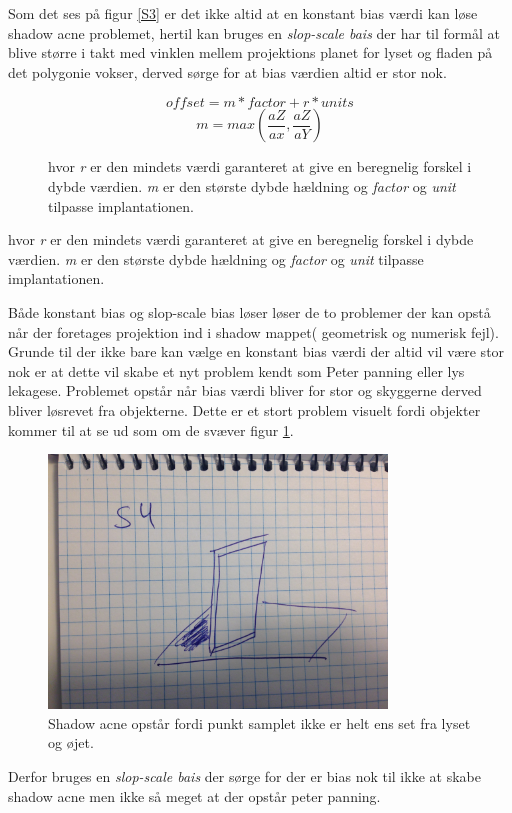 \documentclass[11pt,a4paper]{article}
\begin{document}
Som det ses på figur \ref{S3} er det ikke altid at en konstant bias værdi kan løse shadow acne problemet, hertil kan bruges en \textit{slop-scale bais} der har til formål at blive større i takt med vinklen mellem  projektions planet for lyset og fladen på det polygonie vokser, derved sørge for at bias værdien altid er stor nok. 


\begin{figure}
\[ offset = m * factor + r * units \] 
\[ m = max(\frac{aZ}{ax},\frac{aZ}{aY})\]
\caption{hvor \textit{r} er den mindets værdi garanteret at give en beregnelig forskel i dybde værdien. \textit{m} er den største dybde hældning  og \textit{factor} og \textit{unit} tilpasse implantationen.}
\end{figure}


hvor \textit{r} er den mindets værdi garanteret at give en beregnelig forskel i dybde værdien. \textit{m} er den største dybde hældning  og \textit{factor} og \textit{unit} tilpasse implantationen.

Både konstant bias og slop-scale bias løser løser de to problemer der kan opstå når der foretages projektion ind i shadow mappet( geometrisk og numerisk fejl). Grunde til der ikke bare kan vælge en konstant bias værdi der altid vil være stor nok er at dette vil skabe et nyt problem kendt som Peter panning eller lys lekagese. Problemet opstår når bias værdi bliver for stor og skyggerne derved bliver løsrevet fra objekterne. Dette er et stort problem visuelt fordi objekter kommer til at se ud som om de svæver figur \ref{S4}.

\begin{figure}[ht!]
\centering
\includegraphics[width=90mm]{img/S4.jpg}
\caption{Shadow acne opstår fordi punkt samplet ikke er helt ens set fra lyset og øjet.}
\label{S4}
\end{figure}

Derfor bruges en \textit{slop-scale bais} der sørge for der er bias nok til ikke at skabe shadow acne men ikke så meget at der opstår peter panning.
\end{document}
